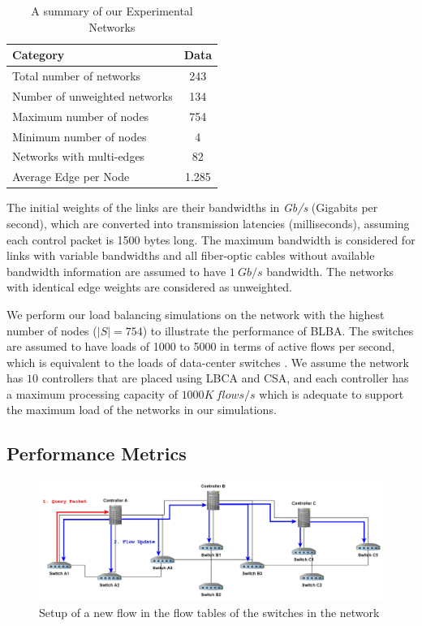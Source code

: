\documentclass[final,5p,times]{cas-dc}
\begin{document}
	\begin{table}
		\centering
		\caption{A summary of our Experimental Networks} \label{tab:zooSummary}
		\begin{tabular}{|l|c|}
			\hline
			\textbf{Category} & \textbf{Data} \\
			\hline
			Total number of networks & 243 \\
			\hline
			Number of unweighted networks & 134 \\
			\hline
			Maximum number of nodes & 754 \\
			\hline
			Minimum number of nodes & 4 \\
			\hline
			Networks with multi-edges & 82\\
			\hline
			Average Edge per Node & 1.285 \\
			\hline
		\end{tabular}
	\end{table}

	The initial weights of the links are their bandwidths in \textit{Gb/s} (Gigabits per second), which are converted into transmission latencies (milliseconds), assuming each control packet is 1500 bytes long. The maximum bandwidth is considered for links with variable bandwidths and all fiber-optic cables without available bandwidth information are assumed to have $1~Gb/s$ bandwidth. The networks with identical edge weights are considered as unweighted.
	
	We perform our load balancing simulations on the network with the highest number of nodes ($|S|=754$) to illustrate the performance of BLBA. The switches are assumed to have loads of 1000 to 5000 in terms of active flows per second, which is equivalent to the loads of data-center switches \cite{benson2010traffic}. We assume the network has $10$ controllers that are placed using LBCA and CSA, and each controller has a maximum processing capacity of $1000K~flows/s$ which is adequate to support the maximum load of the networks in our simulations.
	
	\subsection{Performance Metrics} \label{PerfMetrics}
	
	\begin{figure}
		\centering
		\includegraphics[width=0.95\linewidth]{Images/new_flow.jpg}
		\caption{Setup of a new flow in the flow tables of the switches in the network} \label{new_flow}
	\end{figure}
	
\end{document}
